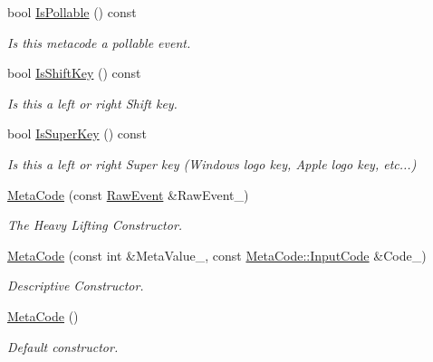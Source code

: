 \begin{DoxyCompactItemize}
bool \hyperlink{classMezzanine_1_1MetaCode_a30c79f6b4fa991a6fa42226f4c255fe9}{IsPollable} () const 
\begin{DoxyCompactList}\small\item\em Is this metacode a pollable event. \item\end{DoxyCompactList}\item 
bool \hyperlink{classMezzanine_1_1MetaCode_a3af3c353b814482fa2c6c68238ced612}{IsShiftKey} () const 
\begin{DoxyCompactList}\small\item\em Is this a left or right Shift key. \item\end{DoxyCompactList}\item 
bool \hyperlink{classMezzanine_1_1MetaCode_a85c370eb28387758e4498d2da656915a}{IsSuperKey} () const 
\begin{DoxyCompactList}\small\item\em Is this a left or right Super key (Windows logo key, Apple logo key, etc...) \item\end{DoxyCompactList}\item 
\hyperlink{classMezzanine_1_1MetaCode_abe2e7fa16bab17df5b1794c26bf191be}{MetaCode} (const \hyperlink{namespaceMezzanine_ae8d4c0ab783af89a250b0225b75753e5}{RawEvent} \&RawEvent\_\-)
\begin{DoxyCompactList}\small\item\em The Heavy Lifting Constructor. \item\end{DoxyCompactList}\item 
\hyperlink{classMezzanine_1_1MetaCode_a2d32eb008845b54c70b510450259404f}{MetaCode} (const int \&MetaValue\_\-, const \hyperlink{classMezzanine_1_1MetaCode_a3b5633f0145bf3287cf53a3f05b5563c}{MetaCode::InputCode} \&Code\_\-)
\begin{DoxyCompactList}\small\item\em Descriptive Constructor. \item\end{DoxyCompactList}\item 
\hyperlink{classMezzanine_1_1MetaCode_a94dca88ec5dd3fc0c9c860bfa875a983}{MetaCode} ()
\begin{DoxyCompactList}\small\item\em Default constructor. \item\end{DoxyCompactList}\item 

\end{DoxyCompactItemize}
